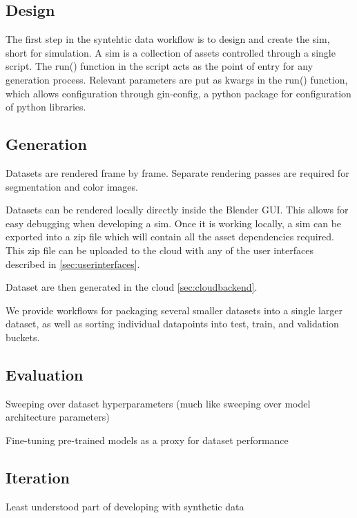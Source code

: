 \documentclass{article}
\begin{document}
\subsection{Design}
\label{sec:worflowdesign}

The first step in the syntehtic data workflow is to design and create the sim, short for simulation. A sim is a collection of assets controlled through a single script. The run() function in the script acts as the point of entry for any generation process. Relevant parameters are put as kwargs in the run() function, which allows configuration through gin-config, a python package for configuration of python libraries.

\subsection{Generation}
\label{sec:generation}

Datasets are rendered frame by frame. Separate rendering passes are required for segmentation and color images.

Datasets can be rendered locally directly inside the Blender GUI. This allows for easy debugging when developing a sim. Once it is working locally, a sim can be exported into a zip file which will contain all the asset dependencies required. This zip file can be uploaded to the cloud with any of the user interfaces described in \ref{sec:userinterfaces}.

Dataset are then generated in the cloud \ref{sec:cloudbackend}.

We provide workflows for packaging several smaller datasets into a single larger dataset, as well as sorting individual datapoints into test, train, and validation buckets.

\subsection{Evaluation}
\label{sec:evaluation}

Sweeping over dataset hyperparameters (much like sweeping over model architecture parameters)

Fine-tuning pre-trained models as a proxy for dataset performance

\subsection{Iteration}
\label{sec:iteration}

Least understood part of developing with synthetic data
\end{document}
